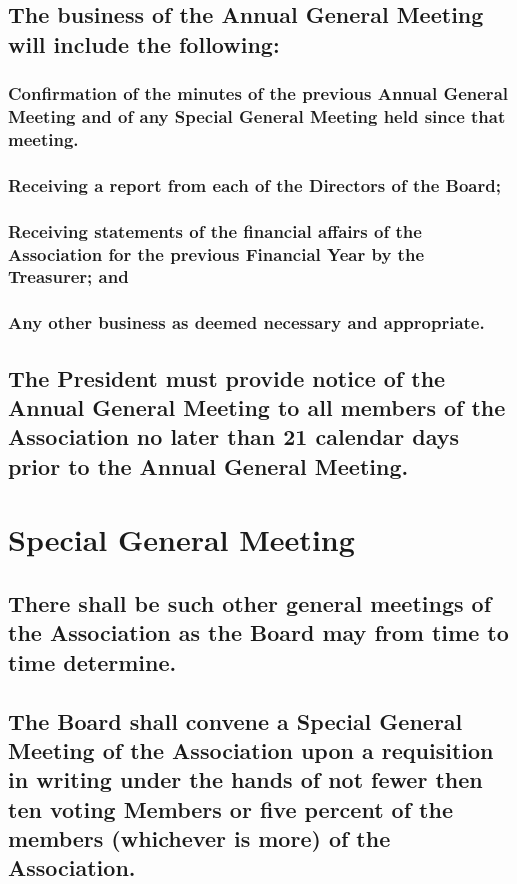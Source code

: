 \documentclass{article}
\newenvironment{subs}
  {\adjustwidth{2em}{0pt}}
  {\endadjustwidth}
\begin{document}
\begin{subs}
\begin{subs}
\begin{subs}
\subsection{The business of the Annual General Meeting will include the following:}
\begin{subs}
\subsubsection{Confirmation of the minutes of the previous Annual General Meeting and of any Special General Meeting held since that meeting.}
\subsubsection{Receiving a report from each of the Directors of the Board;}
\subsubsection{Receiving statements of the financial affairs of the Association for the previous Financial Year by the Treasurer; and}
\subsubsection{Any other business as deemed necessary and appropriate.}
\end{subs}
\subsection{The President must provide notice of the Annual General Meeting to all members of the Association no later than 21 calendar days prior to the Annual General Meeting.}
\end{subs}
\newpage

\section{Special General Meeting}
\begin{subs}
\subsection{There shall be such other general meetings of the Association as the Board may from time to time determine.}
\subsection{The Board shall convene a Special General Meeting of the Association upon a requisition in writing under the hands of not fewer then ten voting Members or five percent of the members (whichever is more) of the Association.}

\end{subs}
\end{subs}
\end{subs}
\end{document}
